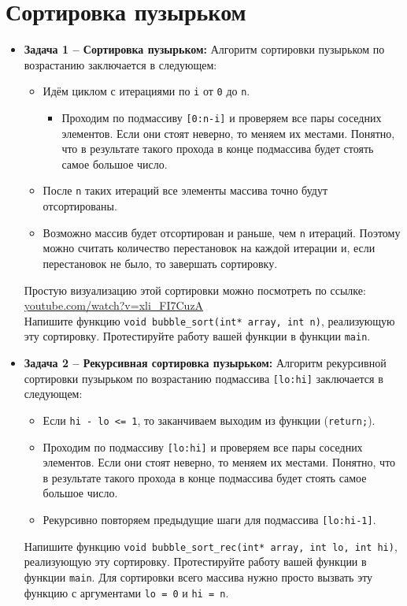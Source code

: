\documentclass{article}
\begin{document}
\section*{Сортировка пузырьком}
\begin{itemize}
\item \textbf{Задача 1 -- Сортировка пузырьком:} Алгоритм сортировки пузырьком по возрастанию заключается в следующем:
\begin{itemize}
\item Идём циклом с итерациями по \texttt{i} от \texttt{0} до \texttt{n}.
\begin{itemize}
\item Проходим по подмассиву \texttt{[0:n-i]} и проверяем все пары соседних элементов. Если они стоят неверно, то меняем их местами. Понятно, что в результате такого прохода в конце подмассива будет стоять самое большое число.
\end{itemize}
\item После \texttt{n} таких итераций все элементы массива точно будут отсортированы.
\item Возможно массив будет отсортирован и раньше, чем \texttt{n} итераций. Поэтому можно считать количество перестановок на каждой итерации и, если перестановок не было, то завершать сортировку.
\end{itemize} 
Простую визуализацию этой сортировки можно посмотреть по ссылке: \href{https://www.youtube.com/watch?v=xli_FI7CuzA}{youtube.com/watch?v=xli\_FI7CuzA}\\ 
Напишите функцию \texttt{void bubble\_sort(int* array, int n)}, реализующую эту сортировку. Протестируйте работу вашей функции в функции \texttt{main}.

\item \textbf{Задача 2 -- Рекурсивная сортировка пузырьком:} Алгоритм рекурсивной сортировки пузырьком по возрастанию подмассива \texttt{[lo:hi]} заключается в следующем:
\begin{itemize}
\item Если \texttt{hi - lo <= 1}, то заканчиваем выходим из функции (\texttt{return;}).
\item Проходим по подмассиву \texttt{[lo:hi]} и проверяем все пары соседних элементов. Если они стоят неверно, то меняем их местами. Понятно, что в результате такого прохода в конце подмассива будет стоять самое большое число.
\item Рекурсивно повторяем предыдущие шаги для подмассива \texttt{[lo:hi-1]}.
\end{itemize}
Напишите функцию \texttt{void bubble\_sort\_rec(int* array, int lo, int hi)}, реализующую эту сортировку. Протестируйте работу вашей функции в функции \texttt{main}.
Для сортировки всего массива нужно просто вызвать эту функцию с аргументами \texttt{lo = 0} и \texttt{hi = n}.
\end{itemize}
\end{document}

